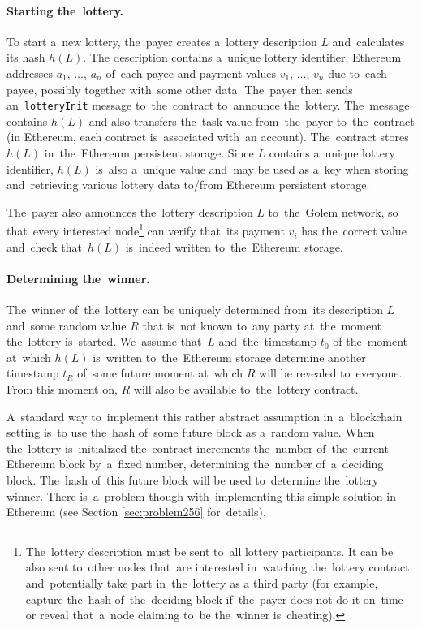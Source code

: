 \documentclass[a4paper]{article}
\newcommand{\lotteryhash}[1]{h({#1})}
\begin{document}
    \paragraph{Starting the~lottery.}
    To start a~new lottery, the~payer creates a~lottery description $L$ and~calculates its hash $\lotteryhash{L}$. The
    description contains a~unique lottery identifier, Ethereum addresses $a_1,\,\ldots,\,a_n$ of~each payee and
    payment values $v_1,\,\ldots,\,v_n$ due to~each payee, possibly together with~some other data. The~payer then
    sends an~\texttt{lotteryInit} message to~the~contract to~announce the~lottery. The~message contains $\lotteryhash{L}$ and
    also transfers the~task value from~the~payer to~the~contract (in Ethereum, each contract is~associated with~an
    account). The~contract stores $\lotteryhash{L}$ in~the~Ethereum persistent storage. Since $L$ contains a~unique lottery
    identifier, $\lotteryhash{L}$ is~also a~unique value and~may be used as a~key when storing and~retrieving various lottery
    data to/from Ethereum persistent storage.

    The~payer also announces the~lottery description $L$ to~the~Golem network, so that~every interested
    node\footnote{ The~lottery description must be sent to~all lottery participants. It can be also sent to~other
    nodes that~are interested in~watching the~lottery contract and~potentially take part in~the~lottery as a
    third party (for example, capture the~hash of~the~deciding block if~the~payer does not do it on~time or reveal
    that~a~node claiming to~be the~winner is~cheating).}
    can verify that~its payment $v_i$ has the~correct value and~check that~$\lotteryhash{L}$ is~indeed written to~the~Ethereum
    storage.

    \paragraph{Determining the~winner.}
    The~winner of~the~lottery can be uniquely determined from~its description $L$ and~some random value $R$ that
    is~not known to~any party at~the~moment the~lottery is~started. We~assume that~$L$ and~the~timestamp $t_0$ of
    the~moment at~which $\lotteryhash{L}$ is~written to~the~Ethereum storage determine another timestamp $t_R$ of~some future
    moment at~which $R$ will be revealed to~everyone. From this moment on, $R$ will also be available to~the~lottery
    contract.

    A~standard way to~implement this rather abstract assumption in~a~blockchain setting is~to use the~hash of~some
    future block as a~random value. When the~lottery is~initialized the~contract increments the~number of~the~current
    Ethereum block by~a~fixed number, determining the~number of~a~deciding block. The~hash of~this future block will
    be used to~determine the~lottery winner. There is~a~problem though with~implementing this simple solution in
    Ethereum (see Section \ref{sec:problem256} for~details).
\end{document}
